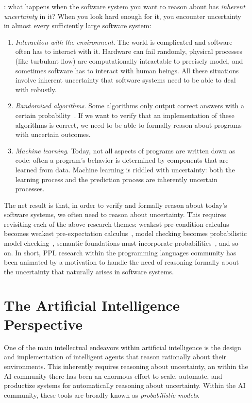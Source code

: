 \documentclass{tufte-handout}
\begin{document}
: what happens when the 
software system you want to reason about has \emph{inherent uncertainty} in it?
When you look hard enough for it, you
encounter uncertainty in almost every sufficiently large software system:
\begin{enumerate}
  \item \emph{Interaction with the environment}. The world is complicated and 
  software often has to interact with it.
  Hardware can fail randomly, physical processes (like turbulant flow)
  are computationally intractable to precisely model, and sometimes software has
  to interact with human beings. All these situations involve inherent
  uncertainty that software systems need to be able to deal with robustly.
  \item \emph{Randomized algorithms}. Some algorithms only output correct 
  answers with a certain probability~\citep{motwani1995randomized}. If we want to verify that an
  implementation of these algorithms is correct, we need to be able to 
  formally reason about programs with uncertain outcomes.
  \item \emph{Machine learning}. Today, not all aspects of programs are written down as code: 
  often a program's behavior is determined by components that are learned from data. Machine 
  learning is riddled with uncertainty: both the learning process and the prediction process 
  are inherently uncertain processes. 
\end{enumerate}

The net result is that, in order to verify and formally reason about today's
software systems, we often need to reason about uncertainty. 
This requires revisiting each of the above research themes: weakest pre-condition 
calculus becomes weakest pre-expectation calculus~\citep{mciver2005abstraction},
model checking becomes probabilistic model checking~\citep{katoen2016probabilistic},
semantic foundations must incorporate probabilities~\citep{kozen1979semantics},
and so on.
In short, PPL research within the programming languages community has been
animated by a motivation to handle the need of reasoning formally about the
uncertainty that naturally arises in software systems.

\section{The Artificial Intelligence Perspective}
One of the main intellectual endeavors within artificial intelligence is the 
design and implementation of intelligent agents that reason rationally about their environments.
This inherently requires reasoning about uncertainty, an within the AI 
community there has been an enormous effort to scale, automate, and productize 
systems for automatically reasoning about uncertainty.
Within the AI community, these tools are broadly known as \emph{probabilistic models}.
\end{document}
